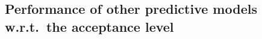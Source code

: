 %
%
%
%


\subsection{Performance of other predictive models w.r.t.\ the acceptance level} \label{subsec:app_reject_real_method}

